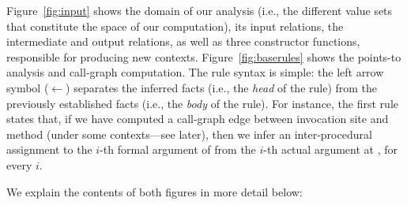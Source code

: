 Figure~\ref{fig:input} shows the domain of our analysis (i.e., the
different value sets that constitute the space of our computation),
its input relations, the intermediate and output relations, as well as
three constructor functions, responsible for producing new
contexts. Figure~\ref{fig:baserules} shows the points-to analysis and
call-graph computation.  The rule syntax is simple: the left arrow
symbol ($\leftarrow$) separates the inferred facts (i.e., the
\emph{head} of the rule) from the previously established facts (i.e.,
the \emph{body} of the rule). For instance, the first rule states
that, if we have computed a call-graph edge between invocation site
 and method  (under some contexts---see later),
then we infer an inter-procedural assignment to the $i$-th formal
argument of  from the $i$-th actual argument at
, for every $i$.

We explain the contents of both figures in more detail below:


